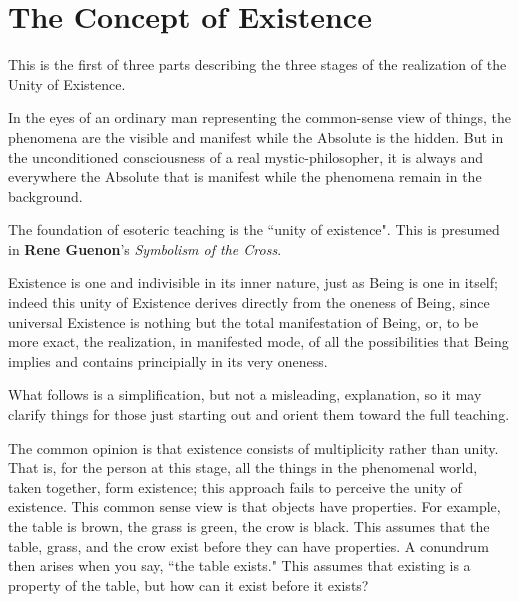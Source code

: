 \section{The Concept of Existence}

This is the first of three parts describing the three stages of the realization of the Unity of Existence.

\begin{quotex}
In the eyes of an ordinary man representing the common-sense view of things, the phenomena are the visible and manifest while the Absolute is the hidden. But in the unconditioned consciousness of a real mystic-philosopher, it is always and everywhere the Absolute that is manifest while the phenomena remain in the background. 

\end{quotex}
The foundation of esoteric teaching is the ``unity of existence". This is presumed in \textbf{Rene Guenon}'s \emph{Symbolism of the Cross}.

\begin{quotex}
Existence is one and indivisible in its inner nature, just as Being is one in itself; indeed this unity of Existence derives directly from the oneness of Being, since universal Existence is nothing but the total manifestation of Being, or, to be more exact, the realization, in manifested mode, of all the possibilities that Being implies and contains principially in its very oneness.

\end{quotex}
What follows is a simplification, but not a misleading, explanation, so it may clarify things for those just starting out and orient them toward the full teaching.

The common opinion is that existence consists of multiplicity rather than unity. That is, for the person at this stage, all the things in the phenomenal world, taken together, form existence; this approach fails to perceive the unity of existence. This common sense view is that objects have properties. For example, the table is brown, the grass is green, the crow is black. This assumes that the table, grass, and the crow exist before they can have properties. A conundrum then arises when you say, ``the table exists." This assumes that existing is a property of the table, but how can it exist before it exists?

